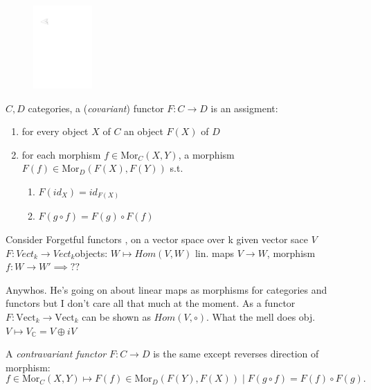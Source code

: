 \documentclass[12pt,oneside]{report}
\begin{document}
\begin{figure}[ht]
    \centering
 \includegraphics[width=0.2\textwidth]{./figures/tcat.pdf}
    \caption{}
    \label{fig:tcat}
\end{figure}

\begin{definition}[functor]
  \( C,D \) categories, a (\textit{covariant}) functor \( F:C \to  D \) is an assigment:
  \begin{enumerate}
    \item for every object \( X \) of \( C \) an object \( F(X) \) of \( D \)
    \item for each morphism \( f \in  \text{Mor}_C(X,Y) \), a morphism \( F(f) \in  \text{Mor}_D(F(X),F(Y)) \) s.t. \begin{enumerate}
        \item \( F(id_X)=id_{F(X)} \)
        \item \( F(g \circ f)= F(g)\circ F(f) \)
    \end{enumerate}
  \end{enumerate}
\end{definition}

Consider Forgetful functors , on a vector space over k given vector sace \( V \) \( F: Vect_k \to Vect_k \)objects: \( W \mapsto Hom(V,W) \) lin. maps \( V \to  W \), morphism \( f: W \to  W'\implies?? \)

Anywhos. He's going on about linear maps as morphisms for categories and functors but I don't care all that much at the moment. As a functor \( F : \text{Vect}_k \to  \text{Vect}_k \) can be shown as \( Hom(V, \circ) \). What the mell does obj. \( V \mapsto V_{\mathbb{C}}=V\oplus iV\)

\begin{definition}
  A \textit{contravariant functor} \( F : C \to D \) is the same except reverses direction of morphism:
  \begin{displaymath}
    f \in  \text{Mor}_C(X,Y) \mapsto F(f) \in  \text{Mor}_D(F(Y),F(X)) \mid  F(g\circ f)=F(f) \circ F(g).
  \end{displaymath}
\end{definition}
\end{document}
